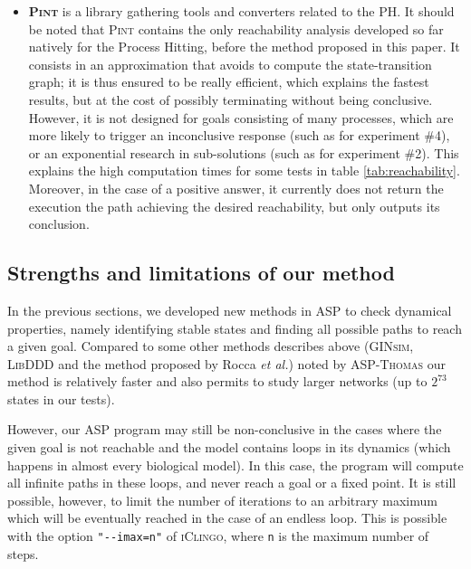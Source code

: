 \begin{itemize}
\item \textbf{\textsc{Pint}}
is a library gathering tools and converters related to the PH.
It should be noted that \textsc{Pint} contains the only reachability analysis
developed so far natively for the Process Hitting,
before the method proposed in this paper.
It consists in an approximation that avoids to compute the state-transition graph;
it is thus ensured to be really efficient, which explains the fastest results,
but at the cost of possibly terminating without being conclusive.
However, it is not designed for goals consisting of many processes,
which are more likely to trigger an inconclusive response
(such as for experiment \#4),
or an exponential research in sub-solutions
(such as for experiment \#2).
This explains the high computation times for some tests in table \ref{tab:reachability}.
Moreover, in the case of a positive answer,
it currently does not return the execution the path achieving the desired reachability,
but only outputs its conclusion.
\end{itemize}

\subsection{Strengths and limitations of our method}
\label{limitations}

In the previous sections,
we developed new methods in ASP to check dynamical properties,
namely identifying stable states and finding all possible paths to reach a given goal.
Compared to some other methods describes above
(\textsc{GINsim}, \textsc{LibDDD} and the method proposed by Rocca \textit{et al.}) noted by \textsc{ASP-Thomas} our method is relatively faster and also permits to study larger networks
(up to $2^{73}$ states in our tests).

However, our ASP program may still be non-conclusive
in the cases where the given goal is not
reachable and the model contains loops in its dynamics
(which happens in almost every biological model).
In this case, the program will compute all infinite paths in these loops,
and never reach a goal or a fixed point.
It is still possible, however, to limit the number of iterations to an arbitrary
maximum which will be eventually reached in the case of an endless loop.
This is possible with the option \texttt{"-{}-imax=n"} of \textsc{iClingo},
where \texttt{n} is the maximum number of steps.

